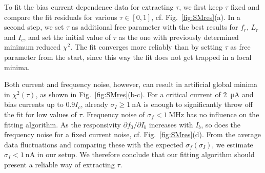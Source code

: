 To fit the bias current dependence data for extracting $\tau$, we first keep $\tau$ fixed and compare the fit residuals for various $\tau\in[0,1]$, cf. Fig.~\ref{fig:SMres}(a).
%
In a second step, we set $\tau$ as additional free parameter with the best results for $f_r$, $L_r$ and $I_c$, and set the initial value of $\tau$ as the one with previously determined minimum reduced $\chi^2$.
%
The fit converges more reliably than by setting $\tau$ as free parameter from the start, since this way the fit does not get trapped in a local minima.

Both current and frequency noise, however, can result in artificial global minima in $\chi^2(\tau)$, as shown in Fig.~\ref{fig:SMres}(b-c).
%
For a critical current of \SI{2}{\micro\ampere} and bias currents up to $0.9I_c$, already $\sigma_I\geq\SI{1}{\nano\ampere}$ is enough to significantly throw off the fit for low values of $\tau$.
%
Frequency noise of $\sigma_f<\SI{1}{\mega\hertz}$ has no influence on the fitting algorithm.
%
As the responsivity $\partial f_0/\partial I_b$ increases with $I_b$, so does the frequency noise for a fixed current noise, cf. Fig.~\ref{fig:SMres}(d).
%
From the average data fluctuations and comparing these with the expected $\sigma_f(\sigma_I)$, we estimate $\sigma_I<\SI{1}{\nano\ampere}$ in our setup.
%
We therefore conclude that our fitting algorithm should present a reliable way of extracting $\tau$. 

